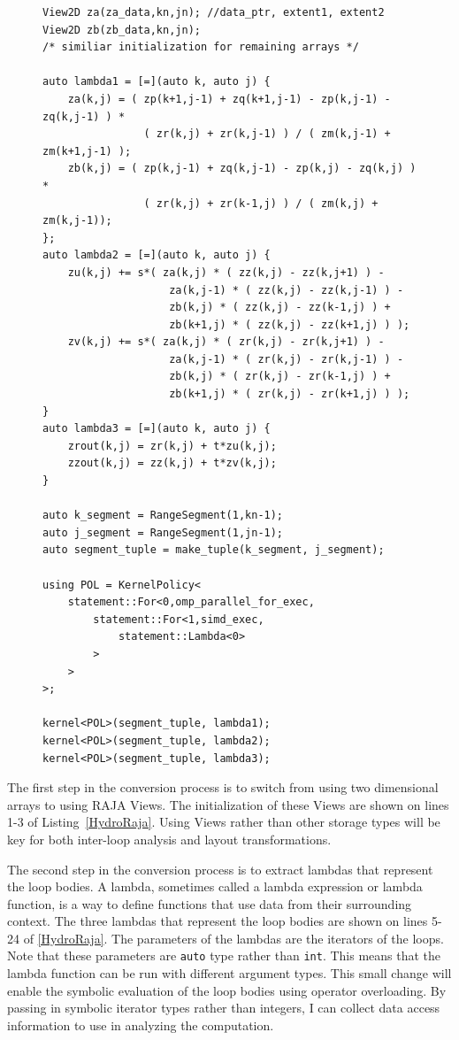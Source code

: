 \documentclass{article}
\begin{document}
\begin{figure}
    \begin{lstlisting}[caption={RAJA implementation of the \texttt{HYDRO\_2D} benchmark},label={HydroRaja}]
View2D za(za_data,kn,jn); //data_ptr, extent1, extent2
View2D zb(zb_data,kn,jn);
/* similiar initialization for remaining arrays */

auto lambda1 = [=](auto k, auto j) {
    za(k,j) = ( zp(k+1,j-1) + zq(k+1,j-1) - zp(k,j-1) - zq(k,j-1) ) *
                ( zr(k,j) + zr(k,j-1) ) / ( zm(k,j-1) + zm(k+1,j-1) ); 
    zb(k,j) = ( zp(k,j-1) + zq(k,j-1) - zp(k,j) - zq(k,j) ) * 
                ( zr(k,j) + zr(k-1,j) ) / ( zm(k,j) + zm(k,j-1));
};
auto lambda2 = [=](auto k, auto j) {
    zu(k,j) += s*( za(k,j) * ( zz(k,j) - zz(k,j+1) ) - 
                    za(k,j-1) * ( zz(k,j) - zz(k,j-1) ) - 
                    zb(k,j) * ( zz(k,j) - zz(k-1,j) ) + 
                    zb(k+1,j) * ( zz(k,j) - zz(k+1,j) ) ); 
    zv(k,j) += s*( za(k,j) * ( zr(k,j) - zr(k,j+1) ) - 
                    za(k,j-1) * ( zr(k,j) - zr(k,j-1) ) - 
                    zb(k,j) * ( zr(k,j) - zr(k-1,j) ) + 
                    zb(k+1,j) * ( zr(k,j) - zr(k+1,j) ) );
}
auto lambda3 = [=](auto k, auto j) {
    zrout(k,j) = zr(k,j) + t*zu(k,j); 
    zzout(k,j) = zz(k,j) + t*zv(k,j);
}

auto k_segment = RangeSegment(1,kn-1);
auto j_segment = RangeSegment(1,jn-1);
auto segment_tuple = make_tuple(k_segment, j_segment);
    
using POL = KernelPolicy<
    statement::For<0,omp_parallel_for_exec,
        statement::For<1,simd_exec,
            statement::Lambda<0>
        >
    >
>;

kernel<POL>(segment_tuple, lambda1);
kernel<POL>(segment_tuple, lambda2);
kernel<POL>(segment_tuple, lambda3);
\end{lstlisting}
\end{figure}

The first step in the conversion process is to switch from using two dimensional arrays to using RAJA Views.
The initialization of these Views are shown on lines 1-3 of Listing~\ref{HydroRaja}.
Using Views rather than other storage types will be key for both inter-loop analysis and layout transformations.

The second step in the conversion process is to extract lambdas that represent the loop bodies. 
A lambda, sometimes called a lambda expression or lambda function, is a way to define functions that use data from their surrounding context.
The three lambdas that represent the loop bodies are shown on lines 5-24 of \autoref{HydroRaja}.
The parameters of the lambdas are the iterators of the loops.
Note that these parameters are \verb.auto. type rather than \verb.int..
This means that the lambda function can be run with different argument types.
This small change will enable the symbolic evaluation of the loop bodies using operator overloading.
By passing in symbolic iterator types rather than integers, I can collect data access information to use in analyzing the computation.
\end{document}
